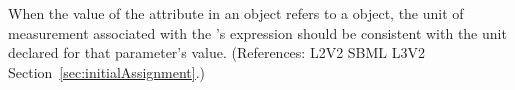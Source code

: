When the value of the attribute  in an \InitialAssignment
object refers to a \Parameter object, the unit of measurement associated
with the \InitialAssignment's  expression should be consistent
with the unit declared for that parameter's value.  (References: L2V2 SBML
L3V2 Section~\ref{sec:initialAssignment}.)
